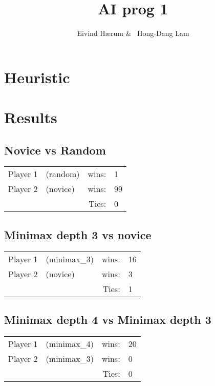 \documentclass[12pt, a4paper]{article}
\title{AI prog 1}
\author{Eivind Hærum \& \ Hong-Dang Lam}
\begin{document}
\maketitle
% 
% 
 
\newpage
\tableofcontents
\newpage
 

\section{Heuristic}

\section{Results}

\subsection{Novice vs Random}
  \begin{tabular}{| l  l  r l |}
    \hline
 	Player 1 & (random) & wins: & 1 \\
 	Player 2 & (novice) & wins: & 99 \\
 	& &  Ties: & 0 \\
    \hline
  \end{tabular}



\subsection{Minimax depth 3 vs novice}
  \begin{tabular}{| l  l  r l |}
    \hline
 	Player 1 & (minimax\_3) & wins: & 16 \\
 	Player 2 & (novice) & wins: & 3 \\
 	& &  Ties: & 1 \\
    \hline
  \end{tabular}


\subsection{Minimax depth 4 vs Minimax depth 3}
  \begin{tabular}{| l  l  r l |}
    \hline
 	Player 1 & (minimax\_4) & wins: & 20 \\
 	Player 2 & (minimax\_3) & wins: & 0 \\
 	& &  Ties: & 0 \\
    \hline
  \end{tabular}
\end{document}
